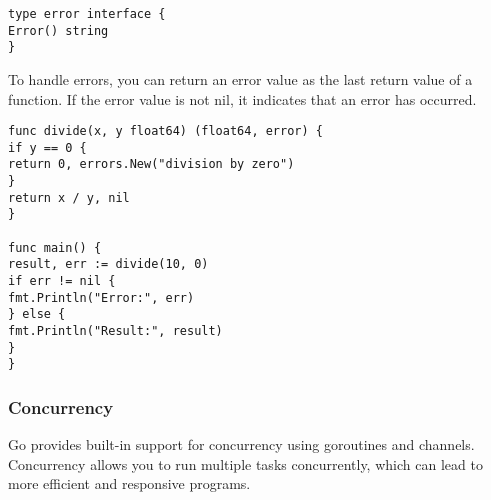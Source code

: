 \documentclass{article}
\begin{document}
\begin{verbatim}
type error interface {
Error() string
}
\end{verbatim}

To handle errors, you can return an error value as the last return value of a function. If the error value is not nil, it indicates that an error has occurred.

\begin{verbatim}
func divide(x, y float64) (float64, error) {
if y == 0 {
return 0, errors.New("division by zero")
}
return x / y, nil
}

func main() {
result, err := divide(10, 0)
if err != nil {
fmt.Println("Error:", err)
} else {
fmt.Println("Result:", result)
}
}
\end{verbatim}

\subsubsection{Concurrency}

Go provides built-in support for concurrency using goroutines and channels. Concurrency allows you to run multiple tasks concurrently, which can lead to more efficient and responsive programs.
\end{document}
